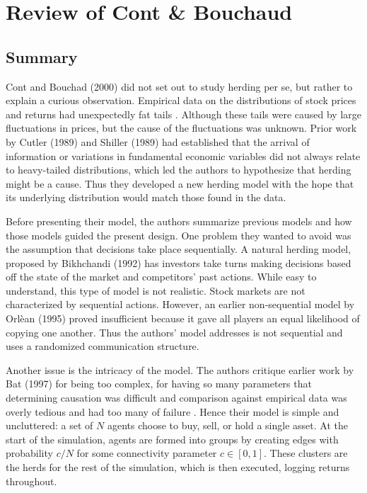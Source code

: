 \documentclass{article}
\begin{document}
\section{Review of Cont \& Bouchaud}
\subsection{Summary}
Cont and Bouchad (2000) did not set out to study herding per se, but rather to explain a curious observation.
Empirical data on the distributions of stock prices and returns had unexpectedly fat tails \cite{cont}.
Although these tails were caused by large fluctuations in prices, but the cause of the fluctuations was unknown.
Prior work by Cutler (1989) and Shiller (1989) had established that the arrival of information or variations in fundamental economic variables did not always relate to heavy-tailed distributions, which led the authors to hypothesize that herding might be a cause.
Thus they developed a new herding model with the hope that its underlying distribution would match those found in the data.

Before presenting their model, the authors summarize previous models and how those models guided the present design.
One problem they wanted to avoid was the assumption that decisions take place sequentially.
A natural herding model, proposed by Bikhchandi (1992) has investors take turns making decisions based off the state of the market and competitors' past actions.
While easy to understand, this type of model is not realistic. 
Stock markets are not characterized by sequential actions.
However, an earlier non-sequential model by Orl\`{e}an (1995) proved insufficient because it gave all players an equal likelihood of copying one another.
Thus the authors' model addresses is not sequential and uses a randomized communication structure.

Another issue is the intricacy of the model.
The authors critique earlier work by Bat (1997) for being too complex, for having so many parameters that determining causation was difficult and comparison against empirical data was overly tedious and had too many of failure \cite{cont}.
Hence their model is simple and uncluttered: a set of $N$ agents choose to buy, sell, or hold a single asset.
At the start of the simulation, agents are formed into groups by creating edges with probability $c/N$ for some connectivity parameter $c \in [0,1]$.
These clusters are the herds for the rest of the simulation, which is then executed, logging returns throughout.
\end{document}
